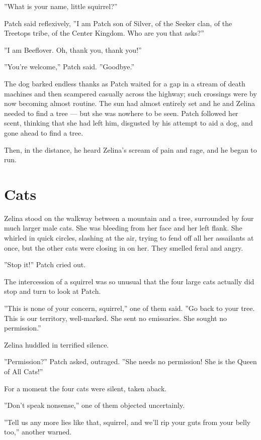 \documentclass[12pt]{book}
\begin{document}
''What is your name, little squirrel?''

Patch said reflexively, ''I am Patch son of Silver, of the Seeker
clan, of the Treetops tribe, of the Center Kingdom. Who are you that
asks?''

''I am Beeflover. Oh, thank you, thank you!''

''You're welcome,'' Patch said. ''Goodbye.''

The dog barked endless thanks as Patch waited for a gap in a stream of
death machines and then scampered casually across the highway; such
crossings were by now becoming almost routine. The sun had almost
entirely set and he and Zelina needed to find a tree --- but she was
nowhere to be seen. Patch followed her scent, thinking that she had
left him, disgusted by his attempt to aid a dog, and gone ahead to
find a tree.

Then, in the distance, he heard Zelina's scream of pain and rage, and
he began to run.


\section{Cats}

Zelina stood on the walkway between a mountain and a tree, surrounded
by four much larger male cats. She was bleeding from her face and her
left flank. She whirled in quick circles, slashing at the air, trying
to fend off all her assailants at once, but the other cats were
closing in on her. They smelled feral and angry.

''Stop it!'' Patch cried out.

The intercession of a squirrel was so unusual that the four large cats
actually did stop and turn to look at Patch.

''This is none of your concern, squirrel,'' one of them said. ''Go
back to your tree. This is our territory, well-marked. She sent no
emissaries. She sought no permission.''

Zelina huddled in terrified silence.

''Permission?'' Patch asked, outraged. ''She needs no permission! She
is the Queen of All Cats!''

For a moment the four cats were silent, taken aback.

''Don't speak nonsense,'' one of them objected uncertainly.

''Tell us any more lies like that, squirrel, and we'll rip your guts
from your belly too,'' another warned.
\end{document}
